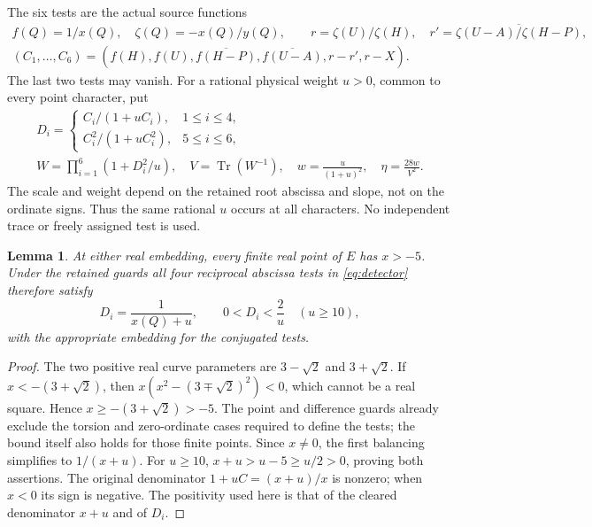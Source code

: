 \documentclass[11pt,a4paper]{article}
\newtheorem{lemma}[theorem]{Lemma}
\newcommand{\Tr}{\operatorname{Tr}}
\begin{document}
The six tests are the actual source functions
\[
 \begin{gathered}
 f(Q)=1/x(Q),\quad \zeta(Q)=-x(Q)/y(Q),\qquad
 r=\zeta(U)/\zeta(H),\quad
 r'=\overline{\zeta(U-A)/\zeta(H-P)},\\
 (C_1,\ldots,C_6)=
 (f(H),f(U),\overline{f(H-P)},\overline{f(U-A)},r-r',r-X).
 \end{gathered}
\]
The last two tests may vanish. For a rational physical weight $u>0$,
common to every point character, put
\begin{equation}\label{eq:detector}
 \begin{gathered}
 D_i=\begin{cases}C_i/(1+uC_i),&1\le i\le4,\\
 C_i^2/(1+uC_i^2),&5\le i\le6,
 \end{cases}\\
 W=\prod_{i=1}^6(1+D_i^2/u),
 \quad V=\Tr(W^{-1}),\quad w=\frac{u}{(1+u)^2},\quad
 \eta=\frac{28w}{V^2}.
 \end{gathered}
\end{equation}
The scale and weight depend on the retained root abscissa and slope,
not on the ordinate signs. Thus the same rational $u$ occurs at all
characters. No independent trace or freely assigned test is used.

\begin{lemma}\label{lem:abscissa}
At either real embedding, every finite real point of $E$ has
$x> -5$. Under the retained guards all four reciprocal abscissa
tests in \eqref{eq:detector} therefore satisfy
\[
              D_i=\frac1{x(Q)+u},\qquad 0<D_i<\frac2u
                         \quad(u\ge10),
\]
with the appropriate embedding for the conjugated tests.
\end{lemma}
\begin{proof}
The two positive real curve parameters are $3-\sqrt2$ and
$3+\sqrt2$. If $x<-(3+\sqrt2)$, then
$x(x^2-(3\mp\sqrt2)^2)<0$, which cannot be a real square.
Hence $x\ge-(3+\sqrt2)>-5$. The point and difference guards
already exclude the torsion and zero-ordinate cases required to
define the tests; the bound itself also holds for those finite
points. Since $x\ne0$, the first balancing simplifies to
$1/(x+u)$. For $u\ge10$,
$x+u>u-5\ge u/2>0$, proving both assertions. The original
denominator $1+uC=(x+u)/x$ is nonzero; when $x<0$ its sign is
negative. The positivity used here is that of the cleared denominator
$x+u$ and of $D_i$.
\end{proof}
\end{document}
